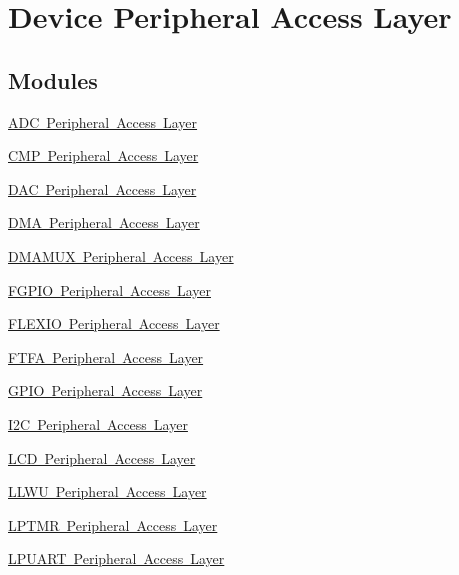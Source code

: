 \hypertarget{group___peripheral__access__layer}{}\section{Device Peripheral Access Layer}
\label{group___peripheral__access__layer}
\subsection*{Modules}
\begin{DoxyCompactItemize}
\item 
\mbox{\hyperlink{group___a_d_c___peripheral___access___layer}{A\+D\+C Peripheral Access Layer}}
\item 
\mbox{\hyperlink{group___c_m_p___peripheral___access___layer}{C\+M\+P Peripheral Access Layer}}
\item 
\mbox{\hyperlink{group___d_a_c___peripheral___access___layer}{D\+A\+C Peripheral Access Layer}}
\item 
\mbox{\hyperlink{group___d_m_a___peripheral___access___layer}{D\+M\+A Peripheral Access Layer}}
\item 
\mbox{\hyperlink{group___d_m_a_m_u_x___peripheral___access___layer}{D\+M\+A\+M\+U\+X Peripheral Access Layer}}
\item 
\mbox{\hyperlink{group___f_g_p_i_o___peripheral___access___layer}{F\+G\+P\+I\+O Peripheral Access Layer}}
\item 
\mbox{\hyperlink{group___f_l_e_x_i_o___peripheral___access___layer}{F\+L\+E\+X\+I\+O Peripheral Access Layer}}
\item 
\mbox{\hyperlink{group___f_t_f_a___peripheral___access___layer}{F\+T\+F\+A Peripheral Access Layer}}
\item 
\mbox{\hyperlink{group___g_p_i_o___peripheral___access___layer}{G\+P\+I\+O Peripheral Access Layer}}
\item 
\mbox{\hyperlink{group___i2_c___peripheral___access___layer}{I2\+C Peripheral Access Layer}}
\item 
\mbox{\hyperlink{group___l_c_d___peripheral___access___layer}{L\+C\+D Peripheral Access Layer}}
\item 
\mbox{\hyperlink{group___l_l_w_u___peripheral___access___layer}{L\+L\+W\+U Peripheral Access Layer}}
\item 
\mbox{\hyperlink{group___l_p_t_m_r___peripheral___access___layer}{L\+P\+T\+M\+R Peripheral Access Layer}}
\item 
\mbox{\hyperlink{group___l_p_u_a_r_t___peripheral___access___layer}{L\+P\+U\+A\+R\+T Peripheral Access Layer}}

\end{DoxyCompactItemize}

